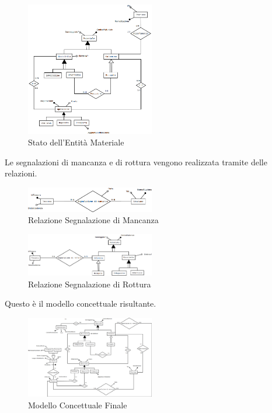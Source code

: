 \documentclass[a4paper,twoside]{article}
\begin{document}
\begin{figure}[H]
 \centering
  \includegraphics[width=0.5\textwidth]{Immagini-Grafici/Concettuale13.png}
\caption{Stato dell'Entità Materiale}
\end{figure}
Le segnalazioni di mancanza e di rottura vengono realizzata tramite delle relazioni.
\begin{figure}[H]
 \centering
  \includegraphics[width=0.5\textwidth]{Immagini-Grafici/Concettuale14.png}
\caption{Relazione Segnalazione di Mancanza}
\end{figure}
\begin{figure}[H]
 \centering
  \includegraphics[width=0.5\textwidth]{Immagini-Grafici/Concettuale15.png}
\caption{Relazione Segnalazione di Rottura}
\end{figure}
Questo è il modello concettuale risultante.
\begin{figure}[H]
 \centering
  \includegraphics[width=0.5\textwidth]{Immagini-Grafici/ConcettualeFinale.png}
\caption{Modello Concettuale Finale}
\end{figure}
\end{document}
